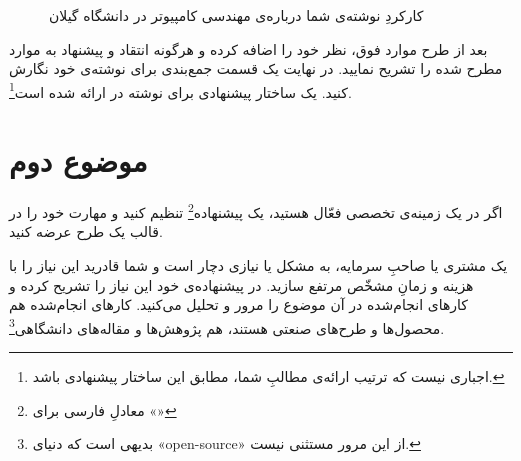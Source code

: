 \documentclass{article}
\begin{document}
\begin{figure}
	\caption{کارکردِ نوشته‌ی شما درباره‌ی مهندسی کامپیوتر در دانشگاه گیلان}
	\label{fig:function}
\end{figure}

بعد از طرح موارد فوق، نظر خود را اضافه کرده و هرگونه انتقاد و پیشنهاد به موارد مطرح شده را تشریح نمایید. در نهایت یک قسمت جمع‌بندی برای نوشته‌ی خود نگارش کنید. یک ساختار پیشنهادی برای نوشته در  ارائه شده است\footnote{اجباری نیست که ترتیب ارائه‌ی مطالبِ شما، مطابق این ساختار پیشنهادی باشد.}.
\section{موضوع دوم}
اگر در یک زمینه‌ی تخصصی فعّال هستید، یک پیشنهاده\footnote{معادلِ فارسی برای «»} تنظیم کنید و مهارت خود را در قالب یک طرح عرضه کنید. 

یک مشتری یا صاحبِ سرمایه، به مشکل یا نیازی دچار است و شما قادرید این نیاز را با هزینه و زمانِ مشخّص مرتفع سازید. در پیشنهاده‌ی خود این نیاز را تشریح کرده و کارهای انجام‌شده در آن موضوع را مرور و تحلیل می‌کنید. کارهای انجام‌شده هم محصول‌ها و طرح‌های صنعتی هستند، هم پژوهش‌ها و مقاله‌های دانشگاهی\footnote{بدیهی است که دنیای «open-source» از این مرور مستثنی نیست.}.
\end{document}
